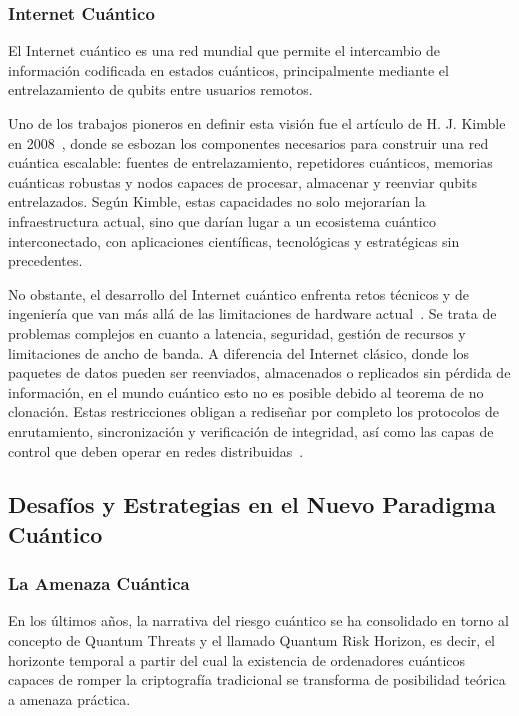 \subsubsection{Internet Cuántico}
El Internet cuántico es una red mundial que permite el intercambio de información codificada en estados cuánticos, principalmente mediante el entrelazamiento de qubits entre usuarios remotos.

Uno de los trabajos pioneros en definir esta visión fue el artículo de H. J. Kimble en 2008~\cite{Kimble2008}, donde se esbozan los componentes necesarios para construir una red cuántica escalable: fuentes de entrelazamiento, repetidores cuánticos, memorias cuánticas robustas y nodos capaces de procesar, almacenar y reenviar qubits entrelazados. Según Kimble, estas capacidades no solo mejorarían la infraestructura actual, sino que darían lugar a un ecosistema cuántico interconectado, con aplicaciones científicas, tecnológicas y estratégicas sin precedentes.

No obstante, el desarrollo del Internet cuántico enfrenta retos técnicos y de ingeniería que van más allá de las limitaciones de hardware actual~\cite{Cacciapuoti2019}. Se trata de problemas complejos en cuanto a latencia, seguridad, gestión de recursos y limitaciones de ancho de banda. A diferencia del Internet clásico, donde los paquetes de datos pueden ser reenviados, almacenados o replicados sin pérdida de información, en el mundo cuántico esto no es posible debido al teorema de no clonación. Estas restricciones obligan a rediseñar por completo los protocolos de enrutamiento, sincronización y verificación de integridad, así como las capas de control que deben operar en redes distribuidas~\cite{Wehner2018}.

\subsection{Desafíos y Estrategias en el Nuevo Paradigma Cuántico}
\subsubsection{La Amenaza Cuántica}

En los últimos años, la narrativa del riesgo cuántico se ha consolidado en torno al concepto de Quantum Threats y el llamado Quantum Risk Horizon, es decir, el horizonte temporal a partir del cual la existencia de ordenadores cuánticos capaces de romper la criptografía tradicional se transforma de posibilidad teórica a amenaza práctica.

